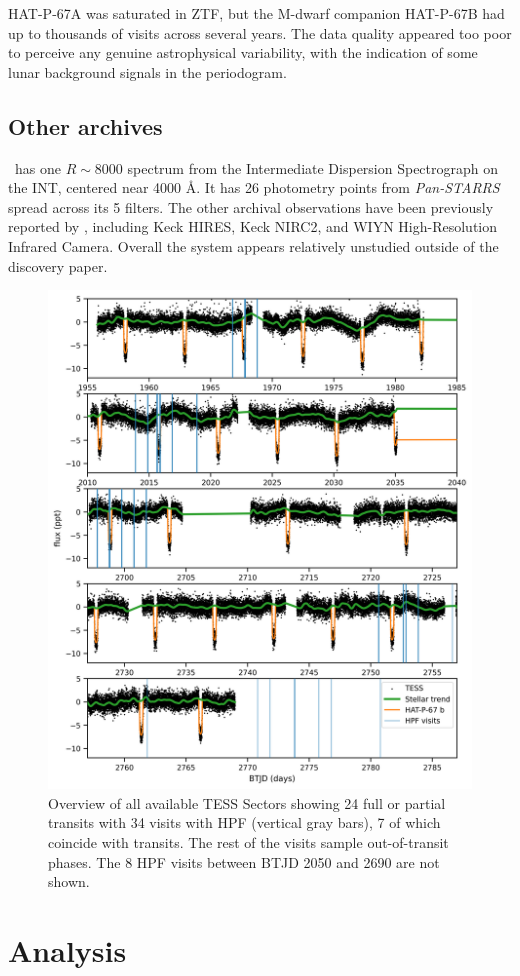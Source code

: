 \documentclass[twocolumn]{aastex631}
\newcommand{\hatp}{\object{HAT-P-67}~}
\begin{document}
HAT-P-67A was saturated in ZTF, but the M-dwarf companion HAT-P-67B had up to thousands of visits across several years.  The data quality appeared too poor to perceive any genuine astrophysical variability, with the indication of some lunar background signals in the periodogram.

\subsection{Other archives}
\hatp has one $R\sim8000$ spectrum from the Intermediate Dispersion Spectrograph on the INT, centered near 4000 \AA.  It has 26 photometry points from \emph{Pan-STARRS} spread across its 5 filters.  The other archival observations have been previously reported by \citet{2017AJ....153..211Z}, including Keck HIRES, Keck NIRC2, and WIYN High-Resolution Infrared Camera.  Overall the system appears relatively unstudied outside of the discovery paper.

\begin{figure}
    \centering
    \includegraphics[width=0.7\linewidth]{figures/TESS_HAT-P-67b_overview.png}
    \caption{Overview of all available TESS Sectors showing 24 full or partial transits with 34 visits with HPF (vertical gray bars), 7 of which coincide with transits.  The rest of the visits sample out-of-transit phases.  The 8 HPF visits between BTJD 2050 and 2690 are not shown.}
    \label{fig:TESSoverview}
\end{figure}


\section{Analysis}
\end{document}
